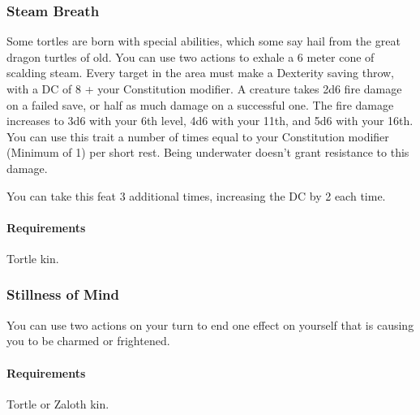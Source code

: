     \subsubsection{Steam Breath} \label{feat::steambreath}
        Some tortles are born with special abilities, which some say hail from the great dragon turtles of old.
        You can use two actions to exhale a 6 meter cone of scalding steam.
        Every target in the area must make a Dexterity saving throw, with a DC of 8 + your Constitution modifier.
        A creature takes 2d6 fire damage on a failed save, or half as much damage on a successful one.
        The fire damage increases to 3d6 with your 6th level, 4d6 with your 11th, and 5d6 with your 16th.
        You can use this trait a number of times equal to your Constitution modifier (Minimum of 1) per short rest.
        Being underwater doesn't grant resistance to this damage.

        You can take this feat 3 additional times, increasing the DC by 2 each time.
        \paragraph{Requirements} Tortle kin.
    \subsubsection{Stillness of Mind} \label{feat::stillnessofmind}
        You can use two actions on your turn to end one effect on yourself that is causing you to be charmed or frightened.
        \paragraph{Requirements} Tortle or Zaloth kin.

\newpage~\newpage
